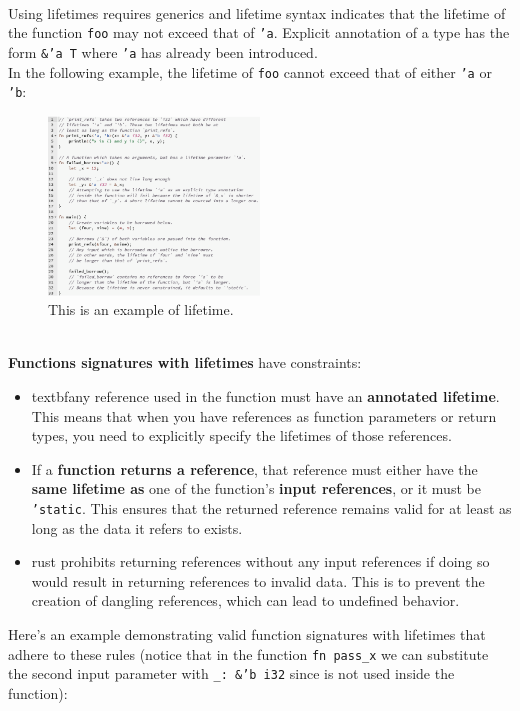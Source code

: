 \documentclass{article}
\begin{document}
\\
Using lifetimes requires generics and lifetime syntax indicates that the lifetime of the function \texttt{foo} may not exceed that of \texttt{'a}. Explicit annotation of a type has the form \texttt{\&'a T} where \texttt{'a} has already been introduced.\\
In the following example, the lifetime of \texttt{foo} cannot exceed that of either \texttt{'a} or \texttt{'b}:
\\
\begin{figure}[h]
  \centering
  \includegraphics[width=0.5\textwidth]{images/explicit_annotation.png} 
  \caption{This is an example of lifetime.}
  \label{fig:explicit_annotation_example}
\end{figure}
\\
\textbf{Functions signatures with lifetimes} have constraints:
\begin{itemize}
    \item textbf{any reference} used in the function must have an \textbf{annotated lifetime}. This means that when you have references as function parameters or return types, you need to explicitly specify the lifetimes of those references.
    \item If a \textbf{function returns a reference}, that reference must either have the \textbf{same lifetime as} one of the function's \textbf{input references}, or it must be \texttt{'static}. This ensures that the returned reference remains valid for at least as long as the data it refers to exists.
    \item rust prohibits returning references without any input references if doing so would result in returning references to invalid data. This is to prevent the creation of dangling references, which can lead to undefined behavior.
\end{itemize}
Here's an example demonstrating valid function signatures with lifetimes that adhere to these rules (notice that in the function \texttt{fn pass\_x} we can substitute the second input parameter with \texttt{\_: \&'b i32} since is not used inside the function):
\end{document}
